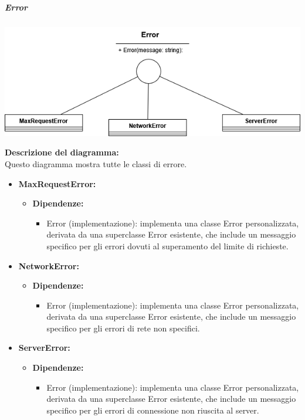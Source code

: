 \subparagraph{Error}
\begin{center}
    \includegraphics[scale=0.45]{template/images/uml_front/logic/error.png}
\end{center}
\textbf{Descrizione del diagramma:}\\
Questo diagramma mostra tutte le classi di errore.
\begin{itemize}
    \item \textbf{MaxRequestError:}
    \begin{itemize}
        \item \textbf{Dipendenze:}
        \begin{itemize}
            \item Error (implementazione): implementa una classe Error personalizzata, derivata da una superclasse Error esistente,
             che include un messaggio specifico per gli errori dovuti al superamento del limite di richieste.
        \end{itemize} 
    \end{itemize}

    \item \textbf{NetworkError:}
    \begin{itemize}
        \item \textbf{Dipendenze:}
        \begin{itemize}
            \item Error (implementazione): implementa una classe Error personalizzata, derivata da una superclasse Error esistente,
            che include un messaggio specifico per gli errori di rete non specifici.
        \end{itemize} 
    \end{itemize}

    \item \textbf{ServerError:}
    \begin{itemize}
        \item \textbf{Dipendenze:}
        \begin{itemize}
            \item Error (implementazione): implementa una classe Error personalizzata, derivata da una superclasse Error esistente,
            che include un messaggio specifico per gli errori di connessione non riuscita al server.
        \end{itemize} 
    \end{itemize}
\end{itemize}

